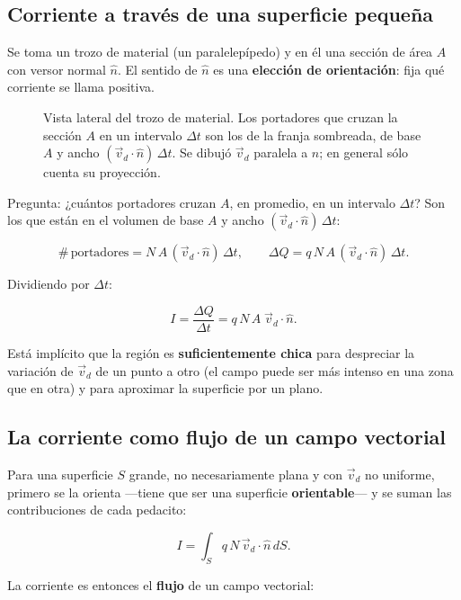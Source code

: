 \documentclass[12pt,a4paper]{article}
\begin{document}
\subsection{Corriente a través de una superficie pequeña}

Se toma un trozo de material (un paralelepípedo) y en él una sección de área
$A$ con versor normal $\hat n$. El sentido de $\hat n$ es una \textbf{elección de
orientación}: fija qué corriente se llama positiva.

\begin{figure}[H]
  \centering
  
  \caption{Vista lateral del trozo de material. Los portadores que cruzan la sección $A$ en un intervalo $\Delta t$ son los de la franja sombreada, de base $A$ y ancho $(\vec v_d\cdot\hat n)\,\Delta t$. Se dibujó $\vec v_d$ paralela a $\hat n$; en general sólo cuenta su proyección.}
\end{figure}

Pregunta: ¿cuántos portadores cruzan $A$, en promedio, en un intervalo
$\Delta t$? Son los que están en el volumen de base $A$ y ancho
$(\vec v_d\cdot\hat n)\,\Delta t$:

\[
\#\,\text{portadores} = N\,A\,(\vec v_d\cdot\hat n)\,\Delta t,
\qquad
\Delta Q = q\,N\,A\,(\vec v_d\cdot\hat n)\,\Delta t .
\]

Dividiendo por $\Delta t$:

\[
I = \frac{\Delta Q}{\Delta t} = q\,N\,A\;\vec v_d\cdot\hat n .
\]

\begin{notebox}
Está implícito que la región es \textbf{suficientemente chica} para despreciar la
variación de $\vec v_d$ de un punto a otro (el campo puede ser más intenso en
una zona que en otra) y para aproximar la superficie por un plano.
\end{notebox}

\subsection{La corriente como flujo de un campo vectorial}

Para una superficie $S$ grande, no necesariamente plana y con $\vec v_d$ no
uniforme, primero se la orienta ---tiene que ser una superficie \textbf{orientable}--- y
se suman las contribuciones de cada pedacito:

\[
I = \int_S q\,N\,\vec v_d\cdot\hat n\,dS .
\]

La corriente es entonces el \textbf{flujo} de un campo vectorial:
\end{document}
